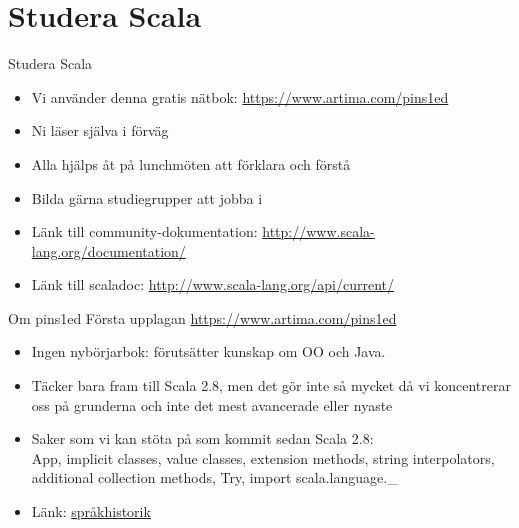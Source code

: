 \documentclass{slides}
\begin{document}
\section{Studera Scala}

\begin{Slide}{Studera Scala}
\begin{itemize}
\item Vi använder denna gratis nätbok: \url{https://www.artima.com/pins1ed}
\item Ni läser själva i förväg
\item Alla hjälps åt på lunchmöten att förklara och förstå
\item Bilda gärna studiegrupper att jobba i 
\item Länk till community-dokumentation: \url{http://www.scala-lang.org/documentation/}
\item Länk till scaladoc: \url{http://www.scala-lang.org/api/current/}

\end{itemize}
\end{Slide}

\begin{Slide}{Om pins1ed}
Första upplagan \url{https://www.artima.com/pins1ed}
\begin{itemize}
\item Ingen nybörjarbok: förutsätter kunskap om OO och Java.
\item Täcker bara fram till Scala 2.8, men det gör inte så mycket då vi koncentrerar oss på grunderna och inte det mest avancerade eller nyaste
\item Saker som vi kan stöta på som kommit sedan Scala 2.8: \\ App, implicit classes, value classes, extension methods, string interpolators, additional collection methods, Try, import scala.language.\_
\item Länk:  \href{https://speakerd.s3.amazonaws.com/presentations/2c9a5a600210013266e732699e109fd5/_.pdf }{språkhistorik}
\end{itemize}
\end{Slide}
\end{document}
